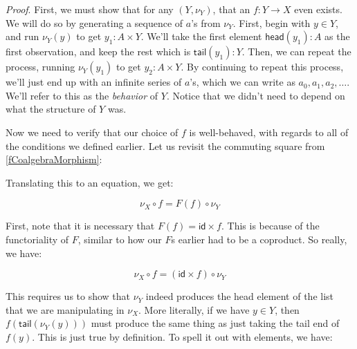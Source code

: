 \documentclass{article}
\theoremstyle{plain}
\theoremstyle{definition}
\begin{document}
\emph{Proof}.  First, we must show that for any \ensuremath{\left( Y, {\nu }_{Y} \right)}, that an \ensuremath{f : Y \rightarrow X} even exists. We will do so by generating a sequence of \ensuremath{a}'s from \ensuremath{{\nu }_{Y}}. First, begin with \ensuremath{y \in Y}, and run \ensuremath{{\nu }_{Y} \left( y \right)} to get \ensuremath{{y}_{1} : A \times Y}. We'll take the first element \ensuremath{\mathsf{head}\left( {y}_{1} \right) : A} as the first observation, and keep the rest which is \ensuremath{\mathsf{tail}\left( {y}_{1} \right) : Y}. Then, we can repeat the process, running \ensuremath{{\nu }_{Y} \left( {y}_{1} \right)} to get \ensuremath{{y}_{2} : A \times Y}. By continuing to repeat this process, we'll just end up with an infinite series of \ensuremath{a}'s, which we can write as \ensuremath{{a}_{0}, {a}_{1}, {a}_{2}, \ldots}. We'll refer to this as the \emph{behavior} of \ensuremath{Y}. Notice that we didn't need to depend on what the structure of \ensuremath{Y} was.

Now we need to verify that our choice of \ensuremath{f} is well-behaved, with regards to all of the conditions we defined earlier. Let us revisit the commuting square from \ref{fCoalgebraMorphism}: 
\begin{center}
\end{center}


Translating this to an equation, we get:

\[
{\nu }_{X} \circ f = F\left( f \right) \circ {\nu }_{Y}
\]

First, note that it is necessary that \ensuremath{F\left( f \right) = \mathsf{id} \times f}. This is because of the functoriality of \ensuremath{F}, similar to how our \ensuremath{F}s earlier had to be a coproduct. So really, we have:

\[
{\nu }_{X} \circ f = \left( \mathsf{id} \times f \right) \circ {\nu }_{Y}
\]

This requires us to show that \ensuremath{{\nu }_{Y}} indeed produces the head element of the list that we are manipulating in \ensuremath{{\nu }_{X}}. More literally, if we have \ensuremath{y \in Y}, then \ensuremath{f\left( \mathsf{tail}\left( {\nu }_{Y} \left( y \right) \right) \right)} must produce the same thing as just taking the tail end of \ensuremath{f\left( y \right)}. This is just true by definition. To spell it out with elements, we have:
\end{document}
